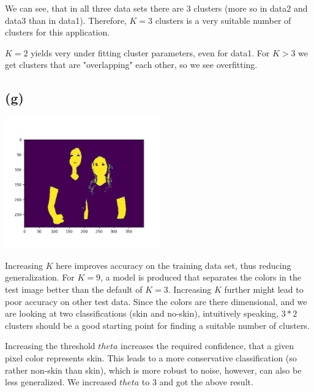 We can see, that in all three data sets there are 3 clusters (more so in data2 and data3 than in data1). Therefore, $K=3$ clusters is a very suitable number of clusters for this application.

$K=2$ yields very under fitting cluster parameters, even for data1. For $K>3$ we get clusters that are "overlapping" each other, so we see overfitting.


\subsection*{(g)}
\includegraphics[width=0.5\textwidth]{Figure_5.png}

Increasing $K$ here improves accuracy on the training data set, thus reducing generalization. For $K=9$, a model is produced that separates the colors in the test image better than the default of $K=3$. Increasing $K$ further might lead to poor accuracy on other test data. Since the colors are there dimensional, and we are looking at two classifications (skin and no-skin), intuitively speaking, $3*2$ clusters should be a good starting point for finding a suitable number of clusters.

Increasing the threshold $theta$ increases the required confidence, that a given pixel color represents skin. This leads to a more conservative classification (so rather non-skin than skin), which is more robust to noise, however, can also be less generalized. We increased $theta$ to $3$ and got the above result.
